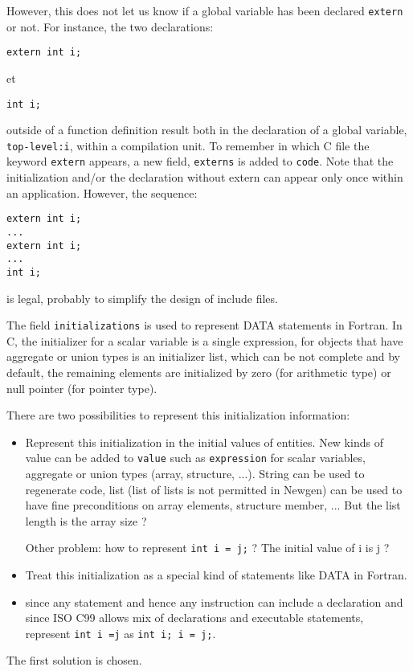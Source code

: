 \documentclass[a4paper]{report}
\begin{document}
However, this does not let us know if a global variable has been
declared \verb/extern/ or not. For instance, the two declarations:
\begin{verbatim}
extern int i;
\end{verbatim}
et
\begin{verbatim}
int i;
\end{verbatim}
outside of a function definition result both in the declaration of a
global variable, \lstinline/top-level:i/, within a compilation unit.
To remember in which C file the keyword \verb/extern/ appears, a new
field, \verb/externs/ is added to \verb/code/. Note that the
initialization and/or the declaration without extern can appear only
once within an application. However, the sequence:
\begin{verbatim}
extern int i;
...
extern int i;
...
int i;
\end{verbatim}
is legal, probably to simplify the design of include files.

The field \verb/initializations/ is used to represent DATA statements
in Fortran. In C, the initializer for a scalar variable is a single
expression, for objects that have aggregate or union types is an
initializer list, which can be not complete and by default, the
remaining elements are initialized by zero (for arithmetic type) or
null pointer (for pointer type).

There are two possibilities to represent this initialization information:
\begin{itemize}
\item Represent this initialization in the initial values of
entities. New kinds of value can be added to \verb/value/ such as
\verb/expression/ for scalar variables, 
aggregate or union types (array, structure, ...). String can be used to
  regenerate code, list (list of lists is not permitted in Newgen) can be used  to
  have fine preconditions on array elements, structure member, ... But the
  list length is the array size ?

Other problem: how to represent \verb/int i = j;/ ? The initial value of i
is j ?
\item Treat this initialization as a special kind of statements like DATA
  in Fortran.
\item since any statement and hence any instruction can include a
  declaration and since ISO C99 allows mix of declarations and
  executable statements, represent \lstinline/int i =j/ as
  \lstinline/int i; i = j;/.
\end{itemize}
The first solution is chosen. 
\end{document}
